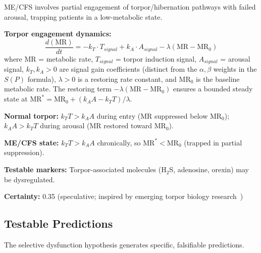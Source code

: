 \begin{speculation}
\label{spec:torpor}
ME/CFS involves partial engagement of torpor/hibernation pathways with failed arousal, trapping patients in a low-metabolic state.

\textbf{Torpor engagement dynamics:}
\[
\frac{d(\text{MR})}{dt} = -k_T \cdot T_{signal} + k_A \cdot A_{signal} - \lambda(\text{MR} - \text{MR}_0)
\]
where MR = metabolic rate, $T_{signal}$ = torpor induction signal, $A_{signal}$ = arousal signal, $k_T, k_A > 0$ are signal gain coefficients (distinct from the $\alpha, \beta$ weights in the $S(P)$ formula), $\lambda > 0$ is a restoring rate constant, and $\text{MR}_0$ is the baseline metabolic rate. The restoring term $-\lambda(\text{MR} - \text{MR}_0)$ ensures a bounded steady state at $\text{MR}^* = \text{MR}_0 + (k_A A - k_T T)/\lambda$.

\textbf{Normal torpor:} $k_T T > k_A A$ during entry (MR suppressed below $\text{MR}_0$); $k_A A > k_T T$ during arousal (MR restored toward $\text{MR}_0$).

\textbf{ME/CFS state:} $k_T T > k_A A$ chronically, so $\text{MR}^* < \text{MR}_0$ (trapped in partial suppression).

\textbf{Testable markers:} Torpor-associated molecules (H$_2$S, adenosine, orexin) may be dysregulated.

\textbf{Certainty:} 0.35 (speculative; inspired by emerging torpor biology research~\cite{Hrvatin2020torpor,Takahashi2020torpor})
\end{speculation}


\subsection{Testable Predictions}

The selective dysfunction hypothesis generates specific, falsifiable predictions.

